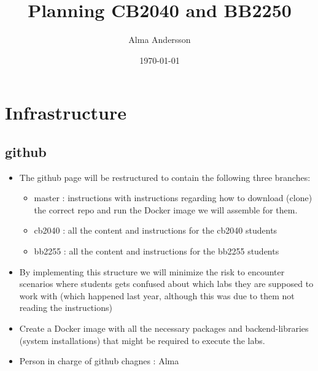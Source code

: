 \documentclass[11pt]{article}
\author{Alma Andersson}
\date{\today}
\title{Planning CB2040 and BB2250}
\begin{document}
\maketitle
\tableofcontents



\section{Infrastructure}
\label{sec:org99ef63a}
\subsection{github}
\label{sec:org0a82b05}
\begin{itemize}
\item The github page will be restructured to contain the following three branches:
\begin{itemize}
\item master : instructions with instructions regarding how to download (clone)
the correct repo and run the Docker image we will assemble for them.
\item cb2040 : all the content and instructions for the cb2040 students
\item bb2255 : all the content and instructions for the bb2255 students
\end{itemize}
\item By implementing this structure we will minimize the risk to encounter
scenarios where students gets confused about which labs they are supposed to
work with (which happened last year, although this was due to them not
reading the instructions)
\item Create a Docker image with all the necessary packages and backend-libraries
(system installations) that might be required to execute the labs.
\item Person in charge of github chagnes : Alma
\end{itemize}
\end{document}

